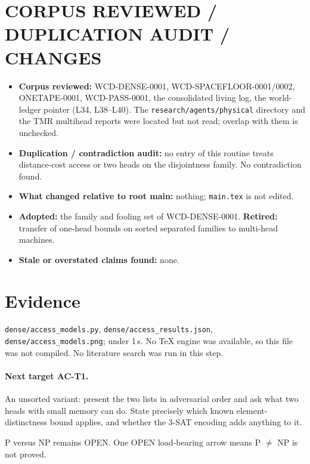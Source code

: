 \documentclass[11pt]{article}
\begin{document}
\section{CORPUS REVIEWED / DUPLICATION AUDIT / CHANGES}
\begin{itemize}
\item \textbf{Corpus reviewed:} WCD-DENSE-0001, WCD-SPACEFLOOR-0001/0002, ONETAPE-0001, WCD-PASS-0001, the consolidated living log, the world-ledger pointer (L34, L38--L40). The \texttt{research/agents/physical} directory and the TMR multihead reports were located but not read; overlap with them is unchecked.
\item \textbf{Duplication / contradiction audit:} no entry of this routine treats distance-cost access or two heads on the disjointness family. No contradiction found.
\item \textbf{What changed relative to root main:} nothing; \texttt{main.tex} is not edited.
\item \textbf{Adopted:} the family and fooling set of WCD-DENSE-0001. \textbf{Retired:} transfer of one-head bounds on sorted separated families to multi-head machines.
\item \textbf{Stale or overstated claims found:} none.
\end{itemize}

\section{Evidence}
\texttt{dense/access\_models.py}, \texttt{dense/access\_results.json}, \texttt{dense/access\_models.png}; under 1\,s. No TeX engine was available, so this file was not compiled. No literature search was run in this step.

\paragraph{Next target AC-T1.} An unsorted variant: present the two lists in adversarial order and ask what two heads with small memory can do. State precisely which known element-distinctness bound applies, and whether the 3-SAT encoding adds anything to it.

\medskip\noindent P versus NP remains OPEN. One OPEN load-bearing arrow means P $\ne$ NP is not proved.
\end{document}
